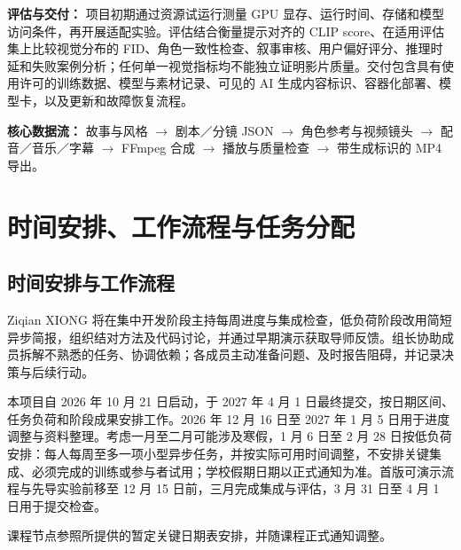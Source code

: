 \documentclass[a4paper,12pt]{article}
\begin{document}
\noindent\textbf{评估与交付：}
项目初期通过资源试运行测量 GPU 显存、运行时间、存储和模型访问条件，再开展适配实验。评估结合衡量提示对齐的 CLIP score、在适用评估集上比较视觉分布的 FID、角色一致性检查、叙事审核、用户偏好评分、推理时延和失败案例分析；任何单一视觉指标均不能独立证明影片质量。交付包含具有使用许可的训练数据、模型与素材记录、可见的 AI 生成内容标识、容器化部署、模型卡，以及更新和故障恢复流程。

\medskip
\noindent\textbf{核心数据流：}
故事与风格 $\rightarrow$ 剧本／分镜 JSON $\rightarrow$ 角色参考与视频镜头 $\rightarrow$ 配音／音乐／字幕 $\rightarrow$ FFmpeg 合成 $\rightarrow$ 播放与质量检查 $\rightarrow$ 带生成标识的 MP4 导出。

\newpage
\section{时间安排、工作流程与任务分配}
\subsection{时间安排与工作流程}
Ziqian XIONG 将在集中开发阶段主持每周进度与集成检查，低负荷阶段改用简短异步简报，组织结对方法及代码讨论，并通过早期演示获取导师反馈。组长协助成员拆解不熟悉的任务、协调依赖；各成员主动准备问题、及时报告阻碍，并记录决策与后续行动。

本项目自 2026 年 10 月 21 日启动，于 2027 年 4 月 1 日最终提交，按日期区间、任务负荷和阶段成果安排工作。2026 年 12 月 16 日至 2027 年 1 月 5 日用于进度调整与资料整理。考虑一月至二月可能涉及寒假，1 月 6 日至 2 月 28 日按低负荷安排：每人每周至多一项小型异步任务，并按实际可用时间调整，不安排关键集成、必须完成的训练或参与者试用；学校假期日期以正式通知为准。首版可演示流程与先导实验前移至 12 月 15 日前，三月完成集成与评估，3 月 31 日至 4 月 1 日用于提交检查。

课程节点参照所提供的暂定关键日期表安排，并随课程正式通知调整。
\end{document}
